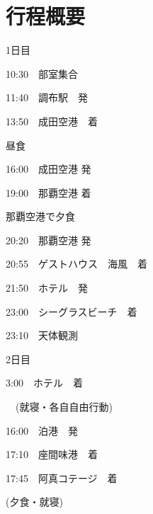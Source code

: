 \documentclass[../main]{subfiles}
\begin{document}
\section{行程概要}
\begin{multicols}{2}
  \small
  \begin{itembox}[l]{1日目}
    \begin{description}
        \item 10:30　部室集合
        \item 11:40　調布駅　発
        \item 13:50　成田空港　着
        \item 昼食
        \item 16:00　成田空港 発
        \item 19:00　那覇空港 着
        \item 那覇空港で夕食
        \item 20:20　那覇空港 発
        \item 20:55　ゲストハウス　海風　着
        \item 21:50　ホテル　発
        \item 23:00　シーグラスビーチ　着
        \item 23:10　天体観測
    \end{description}
  \end{itembox}
  \begin{itembox}[l]{2日目}
    \begin{description}
        \item  3:00　ホテル　着
        \item　(就寝・各自自由行動)
        \item 16:00　泊港　発
        \item 17:10　座間味港　着
        \item 17:45　阿真コテージ　着
        \item (夕食・就寝)
    \end{description}
  \end{itembox}
\end{multicols}
\end{document}
